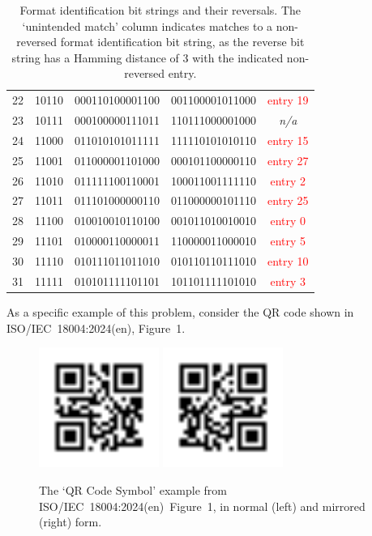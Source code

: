 \documentclass[a4paper,twoside]{article}
\newcommand{\shortstandard}{ISO/IEC~18004}
\newcommand{\standard}{\shortstandard:2024(en)}
\newcommand{\bad}[1]{\textcolor{red}{#1}}
\begin{document}
\begin{table}[h!]
\begin{tabular}{|c|c|c|c|c|}
22 & 10110 & 000110100001100 & 001100001011000 & \bad{entry 19} \\
23 & 10111 & 000100000111011 & 110111000001000 & \textit{n/a} \\
24 & 11000 & 011010101011111 & 111110101010110 & \bad{entry 15} \\
25 & 11001 & 011000001101000 & 000101100000110 & \bad{entry 27} \\
26 & 11010 & 011111100110001 & 100011001111110 & \bad{entry 2} \\
27 & 11011 & 011101000000110 & 011000000101110 & \bad{entry 25} \\
28 & 11100 & 010010010110100 & 001011010010010 & \bad{entry 0} \\
29 & 11101 & 010000110000011 & 110000011000010 & \bad{entry 5} \\
30 & 11110 & 010111011011010 & 010110110111010 & \bad{entry 10} \\
31 & 11111 & 010101111101101 & 101101111101010 & \bad{entry 3} \\
\hline
\end{tabular}
\caption{Format identification bit strings and their reversals. The `unintended match' column indicates matches to a non-reversed format identification bit string, as the reverse bit string has a Hamming distance of 3 with the indicated non-reversed entry.}
\label{tab:format-information-bit-reversal}
\end{table}
\clearpage
As a specific example of this problem, consider the QR code shown in \standard, Figure~1.

\begin{figure}[h!]
\centering
\includegraphics[width=0.35\textwidth]{images/qrcode_iso18004_2024_MirrorExample_Normal_1Mp6.png}
\includegraphics[width=0.35\textwidth]{images/qrcode_iso18004_2024_MirrorExample_HorizontallyMirror_1Mp6.png}
\caption{The `QR Code Symbol' example from \standard~Figure~1, in normal (left) and mirrored (right) form.}
\label{fig:mirror}
\end{figure}
\end{document}
